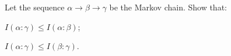 Let the sequence $\alpha \to \beta \to \gamma$ be the Markov chain. Show that:
\begin{enumcyr}
    \item $I(\alpha : \gamma) \le I(\alpha : \beta)$;
    \item $I(\alpha : \gamma) \le I(\beta : \gamma)$.
\end{enumcyr}
